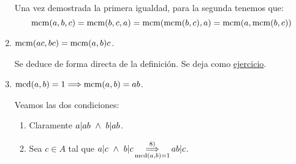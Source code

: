 \begin{enumerate}
    Una vez demostrada la primera igualdad, para la segunda tenemos que:
    \begin{equation*}
        \operatorname{mcm}(a,b,c) = \operatorname{mcm}(b,c,a) = \operatorname{mcm}(\operatorname{mcm}(b,c), a) = \operatorname{mcm}(a,\operatorname{mcm}(b,c))
    \end{equation*}

    \item $\operatorname{mcm}(ac,bc) = \operatorname{mcm}(a,b)c$.
    
    Se deduce de forma directa de la definición. Se deja como \underline{ejercicio}.

    \item $\operatorname{mcd}(a,b)=1 \Longrightarrow \operatorname{mcm}(a,b)=ab$.

    Veamos las dos condiciones:
    \begin{enumerate}
        \item Claramente $a|ab \ \land \  b|ab$.
        \item Sea $c \in A$ tal que $\displaystyle a|c \ \land \  b|c \mathop{\Longrightarrow}_{\operatorname{mcd}(a,b)=1}^{8)} ab|c$.\\
    \end{enumerate}
\end{enumerate}



